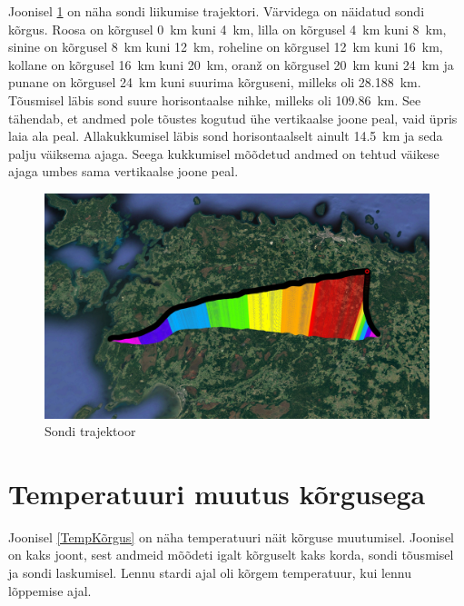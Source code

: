 \documentclass{trkut}%
\begin{document}
Joonisel \ref{trajektoor} on näha sondi liikumise trajektori. Värvidega on näidatud sondi kõrgus. Roosa on kõrgusel \SI{0}{km} kuni \SI{4}{km}, lilla on kõrgusel \SI{4}{km} kuni \SI{8}{km}, sinine on kõrgusel \SI{8}{km} kuni \SI{12}{km}, roheline on kõrgusel \SI{12}{km} kuni \SI{16}{km}, kollane on kõrgusel \SI{16}{km} kuni \SI{20}{km}, oranž on kõrgusel \SI{20}{km} kuni \SI{24}{km} ja punane on kõrgusel \SI{24}{km} kuni suurima kõrguseni, milleks oli \SI{28.188}{km}. Tõusmisel läbis sond suure horisontaalse nihke, milleks oli \SI{109.86}{km}. See tähendab, et andmed pole tõustes kogutud ühe vertikaalse joone peal, vaid üpris laia ala peal. Allakukkumisel läbis sond horisontaalselt ainult \SI{14.5}{km} ja seda palju väiksema ajaga. Seega kukkumisel mõõdetud andmed on tehtud väikese ajaga umbes sama vertikaalse joone peal.
\begin{figure}[h]
	\includegraphics[width=1\textwidth]{PicGra/teekond.jpg}
	\caption{Sondi trajektoor}
	\label{trajektoor}%
\end{figure}

\section{Temperatuuri muutus kõrgusega}
Joonisel \ref{TempKõrgus} on näha temperatuuri näit kõrguse muutumisel. Joonisel on kaks joont, sest andmeid mõõdeti igalt kõrguselt kaks korda, sondi tõusmisel ja sondi laskumisel. Lennu stardi ajal oli kõrgem temperatuur, kui lennu lõppemise ajal.
\end{document}
